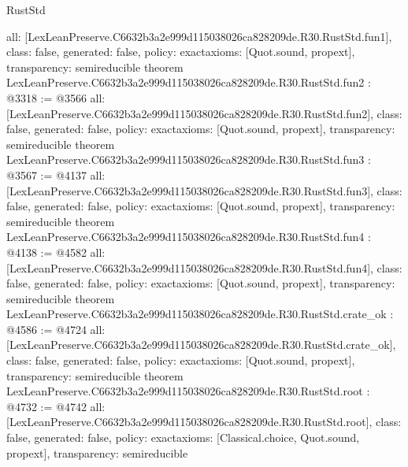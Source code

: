 \begin{lexlean}{RustStd}
\begin{coremodule}
{  all: [LexLeanPreserve.C6632b3a2e999d115038026ca828209de.R30.RustStd.fun1],
  class: false,
  generated: false,
  policy: exact{axioms: [Quot.sound, propext]},
  transparency: semireducible
}
theorem LexLeanPreserve.C6632b3a2e999d115038026ca828209de.R30.RustStd.fun2 : @3318 := @3566 {
  all: [LexLeanPreserve.C6632b3a2e999d115038026ca828209de.R30.RustStd.fun2],
  class: false,
  generated: false,
  policy: exact{axioms: [Quot.sound, propext]},
  transparency: semireducible
}
theorem LexLeanPreserve.C6632b3a2e999d115038026ca828209de.R30.RustStd.fun3 : @3567 := @4137 {
  all: [LexLeanPreserve.C6632b3a2e999d115038026ca828209de.R30.RustStd.fun3],
  class: false,
  generated: false,
  policy: exact{axioms: [Quot.sound, propext]},
  transparency: semireducible
}
theorem LexLeanPreserve.C6632b3a2e999d115038026ca828209de.R30.RustStd.fun4 : @4138 := @4582 {
  all: [LexLeanPreserve.C6632b3a2e999d115038026ca828209de.R30.RustStd.fun4],
  class: false,
  generated: false,
  policy: exact{axioms: [Quot.sound, propext]},
  transparency: semireducible
}
theorem LexLeanPreserve.C6632b3a2e999d115038026ca828209de.R30.RustStd.crate_ok : @4586 := @4724 {
  all: [LexLeanPreserve.C6632b3a2e999d115038026ca828209de.R30.RustStd.crate_ok],
  class: false,
  generated: false,
  policy: exact{axioms: [Quot.sound, propext]},
  transparency: semireducible
}
theorem LexLeanPreserve.C6632b3a2e999d115038026ca828209de.R30.RustStd.root : @4732 := @4742 {
  all: [LexLeanPreserve.C6632b3a2e999d115038026ca828209de.R30.RustStd.root],
  class: false,
  generated: false,
  policy: exact{axioms: [Classical.choice, Quot.sound, propext]},
  transparency: semireducible
}


\end{coremodule}
\end{lexlean}
